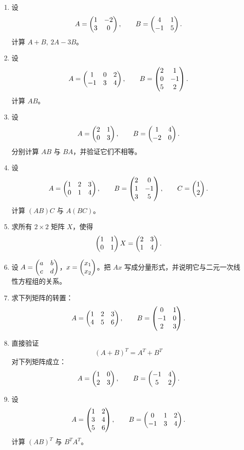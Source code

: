 \begin{enumerate}[label=\arabic*.]
  \item \basic 设
  \[
  A=\begin{pmatrix} 1&-2\\3&0 \end{pmatrix},\qquad B=\begin{pmatrix} 4&1\\-1&5 \end{pmatrix}.
  \]
  计算 $A+B,\ 2A-3B$。

  \item \basic 设
  \[
  A=\begin{pmatrix} 1&0&2\\-1&3&4 \end{pmatrix},\qquad B=\begin{pmatrix} 2&1\\0&-1\\5&2 \end{pmatrix}.
  \]
  计算 $AB$。

  \item \basic 设
  \[
  A=\begin{pmatrix} 2&1\\0&3 \end{pmatrix},\qquad B=\begin{pmatrix} 1&4\\-2&0 \end{pmatrix}.
  \]
  分别计算 $AB$ 与 $BA$，并验证它们不相等。

  \item \basic 设
  \[
  A=\begin{pmatrix} 1&2&3\\0&1&4 \end{pmatrix},\qquad B=\begin{pmatrix} 2&0\\1&-1\\3&5 \end{pmatrix},\qquad C=\begin{pmatrix} 1\\2 \end{pmatrix}.
  \]
  计算 $(AB)C$ 与 $A(BC)$。

  \item \basic 求所有 $2\times2$ 矩阵 $X$，使得
  \[
  \begin{pmatrix} 1&1\\0&1 \end{pmatrix}X=\begin{pmatrix} 2&3\\1&4 \end{pmatrix}.
  \]

  \item \basic 设 $A=\begin{pmatrix} a&b\\c&d \end{pmatrix}$，$x=\begin{pmatrix} x_1\\x_2 \end{pmatrix}$。把 $Ax$ 写成分量形式，并说明它与二元一次线性方程组的关系。

  \item \basic 求下列矩阵的转置：
  \[
  A=\begin{pmatrix} 1&2&3\\4&5&6 \end{pmatrix},\qquad B=\begin{pmatrix} 0&1\\-1&0\\2&3 \end{pmatrix}.
  \]

  \item \basic 直接验证
  \[
  (A+B)^T=A^T+B^T
  \]
  对下列矩阵成立：
  \[
  A=\begin{pmatrix} 1&0\\2&3 \end{pmatrix},\qquad B=\begin{pmatrix} -1&4\\5&2 \end{pmatrix}.
  \]

  \item \basic 设
  \[
  A=\begin{pmatrix} 1&2\\3&4\\5&6 \end{pmatrix},\qquad B=\begin{pmatrix} 0&1&2\\-1&3&4 \end{pmatrix}.
  \]
  计算 $(AB)^T$ 与 $B^TA^T$。


\end{enumerate}
